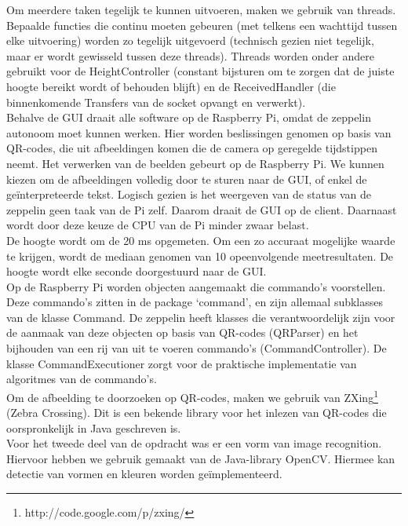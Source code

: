 \documentclass[eind]{penoverslag}
\begin{document}
Om meerdere taken tegelijk te kunnen uitvoeren, maken we gebruik van threads. Bepaalde functies die continu moeten gebeuren (met telkens een wachttijd tussen elke uitvoering) worden zo tegelijk uitgevoerd (technisch gezien niet tegelijk, maar er wordt gewisseld tussen deze threads). Threads worden onder andere gebruikt voor de HeightController (constant bijsturen om te zorgen dat de juiste hoogte bereikt wordt of behouden blijft) en de ReceivedHandler (die binnenkomende Transfers van de socket opvangt en verwerkt). \\

Behalve de GUI draait alle software op de Raspberry Pi, omdat de zeppelin autonoom moet kunnen werken. Hier worden beslissingen genomen op basis van QR-codes, die uit afbeeldingen komen die de camera op geregelde tijdstippen neemt. Het verwerken van de beelden gebeurt op de Raspberry Pi. We kunnen kiezen om de afbeeldingen volledig door te sturen naar de GUI, of enkel de ge\"interpreteerde tekst. Logisch gezien is het weergeven van de status van de zeppelin geen taak van de Pi zelf. Daarom draait de GUI op de client. Daarnaast wordt door deze keuze de CPU van de Pi minder zwaar belast. \\

De hoogte wordt om de 20 ms opgemeten. Om een zo accuraat mogelijke waarde te krijgen, wordt de mediaan genomen van 10 opeenvolgende meetresultaten. De hoogte wordt elke seconde doorgestuurd naar de GUI. \\

Op de Raspberry Pi worden objecten aangemaakt die commando's voorstellen. Deze commando's zitten in de package `command', en zijn allemaal subklasses van de klasse Command. De zeppelin heeft klasses die verantwoordelijk zijn voor de aanmaak van deze objecten op basis van QR-codes (QRParser) en het bijhouden van een rij van uit te voeren commando's (CommandController). De klasse CommandExecutioner zorgt voor de praktische implementatie van algoritmes van de commando's. \\

Om de afbeelding te doorzoeken op QR-codes, maken we gebruik van ZXing\footnote{http://code.google.com/p/zxing/} (Zebra Crossing). Dit is een bekende library voor het inlezen van QR-codes die oorspronkelijk in Java geschreven is. \\

Voor het tweede deel van de opdracht was er een vorm van image recognition. Hiervoor hebben we gebruik gemaakt van de Java-library OpenCV. Hiermee kan detectie van vormen en kleuren worden ge\"implementeerd. 
\end{document}
